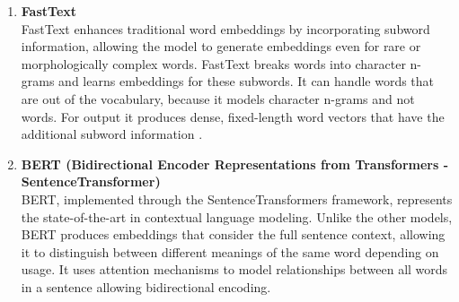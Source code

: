 \documentclass[\myFontSize,a4paper,oneside,english,hidelinks]{article}
\begin{document}
\begin{enumerate}
\item \textbf{FastText}\\
FastText enhances traditional word embeddings by incorporating subword information, allowing the model to generate embeddings even for rare or morphologically complex words. FastText breaks words into character n-grams and learns embeddings for these subwords. It can handle words that are out of the vocabulary, because it models character n-grams and not words. For output it produces dense, fixed-length word vectors that have the additional subword information \cite{Yan2024}.


\item \textbf{BERT (Bidirectional Encoder Representations from Transformers - SentenceTransformer)}\\
BERT, implemented through the SentenceTransformers framework, represents the state-of-the-art in contextual language modeling. Unlike the other models, BERT produces embeddings that consider the full sentence context, allowing it to distinguish between different meanings of the same word depending on usage. It uses attention mechanisms to model relationships between all words in a sentence allowing bidirectional encoding.



%


\end{enumerate}
\end{document}
